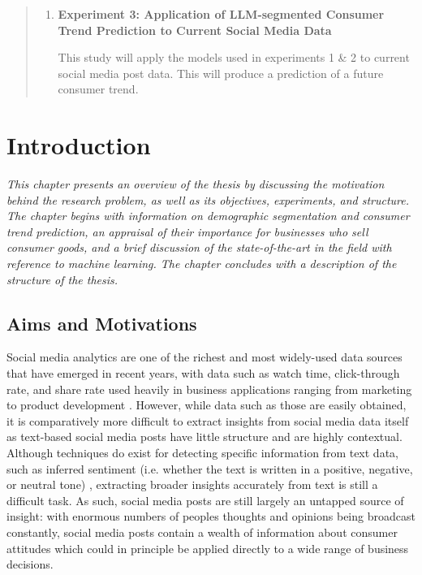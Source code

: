 \documentclass{report}
\begin{document}
\begin{abstract}
\begin{enumerate}
\item \textbf{Experiment 3: Application of LLM-segmented Consumer Trend Prediction to Current Social Media Data}

This study will apply the models used in experiments 1 \& 2 to current social media post data. This will produce a prediction of a future consumer trend.
\end{enumerate}


\end{abstract}

\tableofcontents
\listoffigures
\listoftables


\chapter{Introduction}

\begin{adjustwidth}{0.5in}{0.5in}
\textit{This chapter presents an overview of the thesis by discussing the motivation behind the research problem, as well as its objectives, experiments, and structure. The chapter begins with information on demographic segmentation and consumer trend prediction, an appraisal of their importance for businesses who sell consumer goods, and a brief discussion of the state-of-the-art in the field with reference to machine learning. The chapter concludes with a description of the structure of the thesis.}
\end{adjustwidth}

\section{Aims and Motivations}

Social media analytics are one of the richest and most widely-used data sources that have emerged in recent years, with data such as watch time, click-through rate, and share rate used heavily in business applications ranging from marketing to product development \cite{chaffey2019digital}. However, while data such as those are easily obtained, it is comparatively more difficult to extract insights from social media data itself as text-based social media posts have little structure and are highly contextual. Although techniques do exist for detecting specific information from text data, such as inferred sentiment (i.e. whether the text is written in a positive, negative, or neutral tone) \cite{liu2022sentiment}, extracting broader insights accurately from text is still a difficult task. As such, social media posts are still largely an untapped source of insight: with enormous numbers of peoples thoughts and opinions being broadcast constantly, social media posts contain a wealth of information about consumer attitudes which could in principle be applied directly to a wide range of business decisions.
\end{document}

